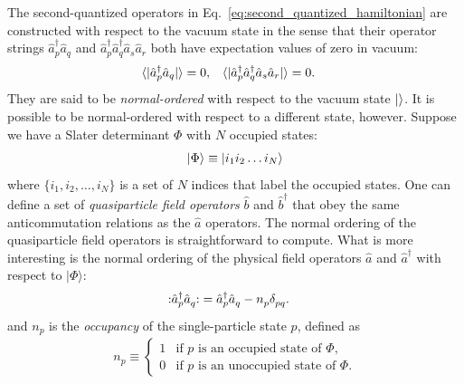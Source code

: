 The second-quantized operators in Eq.\ \eqref{eq:second_quantized_hamiltonian} are constructed with respect to the vacuum state in the sense that their operator strings $\hat{a}_p^\dagger \hat{a}_q$ and $\hat{a}_p^\dagger \hat{a}_q^\dagger \hat{a}_s \hat{a}_r$ both have expectation values of zero in vacuum:
\begin{align*}
&\langle  | \hat{a}_p^\dagger \hat{a}_q |  \rangle = 0, &
&\langle  | \hat{a}_p^\dagger \hat{a}_q^\dagger \hat{a}_s \hat{a}_r |  \rangle = 0.
\end{align*}
They are said to be \emph{normal-ordered} with respect to the vacuum state $|  \rangle$.  It is possible to be normal-ordered with respect to a different state, however.  Suppose we have a Slater determinant $\Phi$ with $N$ occupied states:
\begin{align*}
  | \Phi \rangle \equiv | i_1 i_2 \ldots i_N \rangle
\end{align*}
where $\{i_1, i_2, \ldots, i_N\}$ is a set of $N$ indices that label the occupied states.  One can define a set of \textit{quasiparticle field operators} $\hat b$ and $\hat b^\dagger$ that obey the same anticommutation relations as the $\hat a$ operators.  The normal ordering of the quasiparticle field operators is straightforward to compute.  What is more interesting is the normal ordering of the physical field operators $\hat a$ and $\hat a^\dagger$ with respect to $|\Phi\rangle$:
\begin{align*}
  \mathopen: \hat{a}_p^\dagger \hat{a}_q^{} \mathclose: &= \hat{a}_p^\dagger \hat{a}_q^{} - n_p^{} \delta_{p q}^{}.
\end{align*}
and $n_p$ is the \textit{occupancy} of the single-particle state $p$, defined as
\begin{align}
  n_p \equiv \begin{cases}
    1 & \text{if $p$ is an occupied state of $\Phi$}, \\
    0 & \text{if $p$ is an unoccupied state of $\Phi$}.
  \end{cases}
\end{align}


